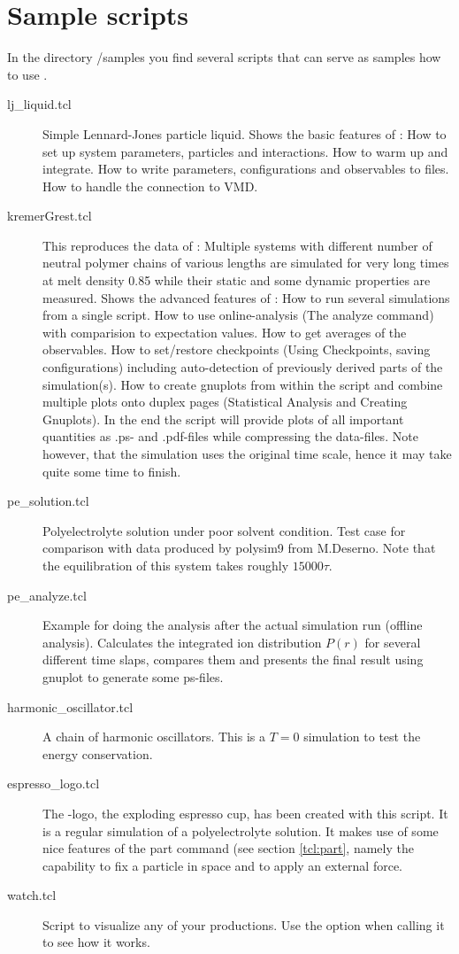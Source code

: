 \chapter{Sample scripts}
\label{chap:samples}

In the directory \es{}/samples you find several scripts that can serve
as samples how to use \es{}.
\begin{description}
\item[lj\_liquid.tcl] Simple Lennard-Jones particle liquid. Shows the
  basic features of \es: How to set up system parameters, particles
  and interactions. How to warm up and integrate. How to write
  parameters, configurations and observables to files. How to handle
  the connection to VMD.
\item[kremerGrest.tcl] This reproduces the data of \citet{kremer90a}:
  Multiple systems with different number of neutral polymer chains of
  various lengths are simulated for very long times at melt density
  0.85 while their static and some dynamic properties are measured.
  Shows the advanced features of \es{}: How to run several simulations
  from a single script. How to use online-analysis (The analyze
  command) with comparision to expectation values. How to get averages
  of the observables. How to set/restore checkpoints (Using
  Checkpoints, saving configurations) including auto-detection of
  previously derived parts of the simulation(s). How to create
  gnuplots from within the script and combine multiple plots onto
  duplex pages (Statistical Analysis and Creating Gnuplots).  In the
  end the script will provide plots of all important quantities as
  .ps- and .pdf-files while compressing the data-files. Note however,
  that the simulation uses the original time scale, hence it may take
  quite some time to finish.
\item[pe\_solution.tcl] Polyelectrolyte solution under poor solvent
  condition. Test case for comparison with data produced by polysim9
  from M.Deserno. Note that the equilibration of this system takes
  roughly $15000 \tau$.
\item[pe\_analyze.tcl] Example for doing the analysis after the actual
  simulation run (offline analysis). Calculates the integrated ion
  distribution $P(r)$ for several different time slaps, compares them
  and presents the final result using gnuplot to generate some
  ps-files.
\item[harmonic\_oscillator.tcl] A chain of harmonic oscillators. This
  is a $T=0$ simulation to test the energy conservation.
\item[espresso\_logo.tcl] The \es-logo, the exploding espresso cup,
  has been created with this script. It is a regular simulation of a
  polyelectrolyte solution. It makes use of some nice features of the
  part command (see section \vref{tcl:part}, namely the capability to
  fix a particle in space and to apply an external force.
\item[watch.tcl] Script to visualize any of your productions. Use the
   option when calling it to see how it works.
\end{description}

